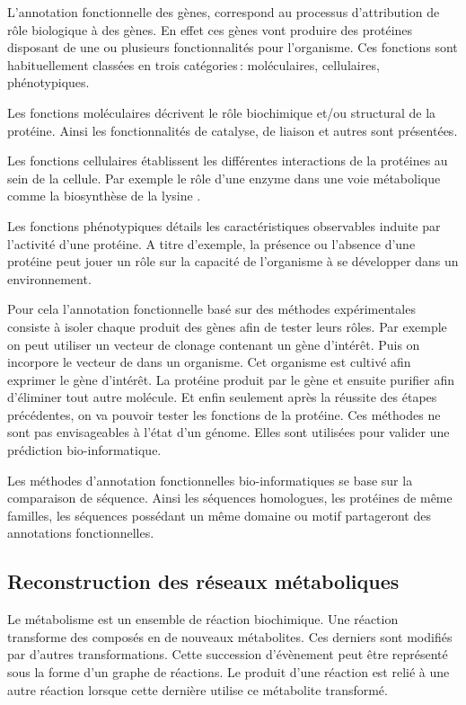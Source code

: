\begin{refsection}
    L’annotation fonctionnelle des gènes, correspond au processus d’attribution de rôle biologique à des gènes. En effet ces gènes vont produire des protéines disposant de une ou plusieurs fonctionnalités pour l’organisme. Ces fonctions sont habituellement classées en trois catégories : moléculaires, cellulaires, phénotypiques.
    
    Les fonctions moléculaires décrivent le rôle biochimique et/ou structural de la protéine. Ainsi les fonctionnalités de catalyse, de liaison et autres sont présentées.
    
    Les fonctions cellulaires établissent les différentes interactions de la protéines au sein de la cellule. Par exemple le rôle d’une enzyme dans une voie métabolique comme la biosynthèse de la lysine . 
    
    Les fonctions phénotypiques détails les caractéristiques observables induite par l’activité d’une protéine. A titre d’exemple, la présence ou l’absence d’une protéine peut jouer un rôle sur la capacité de l’organisme à se développer dans un environnement.
    
    Pour cela l’annotation fonctionnelle basé sur des méthodes expérimentales consiste à isoler chaque produit des gènes afin de tester leurs rôles. Par exemple on peut utiliser un vecteur de clonage contenant un gène d'intérêt. Puis on incorpore le vecteur de dans un organisme. Cet organisme est cultivé afin exprimer le gène d'intérêt. La protéine produit par le gène et ensuite purifier afin d'éliminer tout autre molécule. Et enfin seulement après la réussite des étapes précédentes, on va pouvoir tester les fonctions de la protéine.  Ces méthodes ne sont  pas envisageables à l’état d’un génome. Elles sont utilisées pour valider une prédiction bio-informatique.
    
    Les méthodes d’annotation fonctionnelles  bio-informatiques se base sur la comparaison de séquence. Ainsi les séquences homologues, les protéines de même familles, les séquences possédant un même domaine ou motif partageront des annotations fonctionnelles.
    
    \subsection{Reconstruction des réseaux métaboliques}
    Le métabolisme est un ensemble de réaction biochimique. Une réaction transforme des composés en de nouveaux métabolites. Ces derniers sont modifiés par d'autres transformations. Cette succession d'évènement peut être représenté sous la forme d’un graphe de réactions. Le produit d’une réaction est relié à une autre réaction lorsque cette dernière utilise ce métabolite transformé.
    

\end{refsection}
